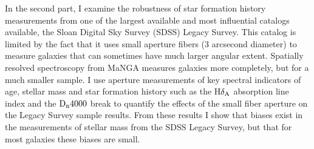 In the second part, I examine the robustness of star formation history measurements from one of the largest available and most influential catalogs available, the Sloan Digital Sky Survey (SDSS) Legacy Survey. This catalog is limited by the fact that it uses small aperture fibers (3 arcsecond diameter) to measure galaxies that can sometimes have much larger angular extent. Spatially resolved spectroscopy from MaNGA measures galaxies more completely, but for a much smaller sample. I use aperture measurements of key spectral indicators of age, stellar mass and star formation history such as the H$ \delta_{\rm A}$ absorption line index and the ${\rm D}_{\rm n}4000$ break to quantify the effects of the small fiber aperture on the Legacy Survey sample results. From these results I show that biases exist in the measurements of stellar mass from the SDSS Legacy Survey, but that for most galaxies these biases are small.\\